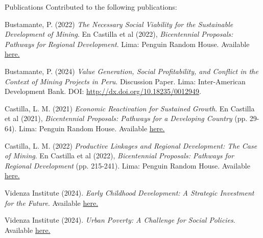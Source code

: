 \documentclass{resume} %
\begin{document}
\begin{rSection}{Publications}
Contributed to the following publications:
\item Bustamante, P. (2022) \emph{The Necessary Social Viability for the Sustainable Development of Mining}. En Castilla et al (2022), \textit{Bicentennial Proposals: Pathways for Regional Development}. Lima: Penguin Random House. Available \href{https://books.google.com/books/about/Propuestas_del_bicentenario.html?id=nfF3EAAAQBAJ}{here.}
\item Bustamante, P. (2024) \emph{Value Generation, Social Profitability, and Conflict in the Context of Mining Projects in Peru}. Discussion Paper. Lima: Inter-American Development Bank. DOI: \href{http://dx.doi.org/10.18235/0012949}{http://dx.doi.org/10.18235/0012949}.
\item Castilla, L. M. (2021) \emph{Economic Reactivation for Sustained Growth}. En Castilla et al (2021), \textit{Bicentennial Proposals: Pathways for a Developing Country} (pp. 29-64). Lima: Penguin Random House. Available \href{https://www.google.com/books/edition/_/3UanzgEACAAJ?hl=es&sa=X&ved=2ahUKEwjHq8K_jvmJAxVBvokEHUT-ERcQre8FegQIFRAC}{here.}
\item Castilla, L. M. (2022) \emph{Productive Linkages and Regional Development: The Case of Mining}.  En Castilla et al (2022), \textit{Bicentennial Proposals: Pathways for Regional Development} (pp. 215-241). Lima: Penguin Random House. Available \href{https://books.google.com/books/about/Propuestas_del_bicentenario.html?id=nfF3EAAAQBAJ}{here.}
\item Videnza Institute (2024). \emph{Early Childhood Development: A Strategic Investment for the Future}. Available \href{https://propuestasdelbicentenario.pe/wp-content/uploads/2024/08/Informe-de-desarrollo-infantil-temprano.pdf}{here.}
\item Videnza Institute (2024). \emph{Urban Poverty: A Challenge for Social Policies}. Available \href{https://propuestasdelbicentenario.pe/wp-content/uploads/2024/08/Pobreza-urbana_un-desafio-para-las-politicas-sociales.pdf}{here.}
\end{rSection}

\end{document}

